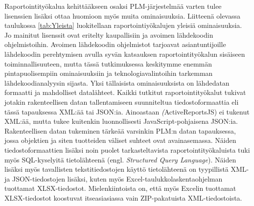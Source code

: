 Raportointityökalua kehittääkseen osaksi PLM-järjestelmää varten tulee lisenssien lisäksi ottaa huomioon myös muita ominaisuuksia. Liitteenä olevassa taulukossa \ref{tab:Yleista} luokitellaan raportointiyökalujen yleisiä ominaisuuksia. Jo mainitut lisenssit ovat eritelty kaupallisiin ja avoimen lähdekoodin ohjelmistoihin. Avoimen lähdekoodin ohjelmistot tarjoavat asiantuntijoille lähdekoodin perehtymisen avulla syvän katsauksen raportointityökalun sisäiseen toiminnallisuuteen, mutta tässä tutkimuksessa keskitymme enemmän pintapuolisempiin ominaisuuksiin ja teknologiavalintoihin tarkemman lähdekoodianalyysin sijasta. Yksi tällaisista ominaisuuksista on lähdedatan formaatti ja mahdolliset datalähteet. Kaikki tutkitut raportointityökalut tukivat jotakin rakenteellisen datan tallentamiseen suunniteltua tiedostoformaattia eli tässä tapauksessa XML:ää tai JSON:ia. Ainoastaan \textit(ActiveReportsJS) ei tukenut XML:ää, mutta tukee kuitenkin luonnollisesti JavaScript-pohjaisena JSON:ia. Rakenteellisen datan tukeminen tärkeää varsinkin PLM:n datan tapauksessa, jossa objektien ja siten tuotteiden väliset suhteet ovat avainasemassa. Näiden tiedostoformaattien lisäksi noin puolet tarkasteltavista raportointityökaluista tuki myös SQL-kyselyitä tietolähteenä  (engl. \textit{Structured Query Language}). Näiden lisäksi myös tavallisten tekstitiedostojen käyttö tietolähteenä on tyypillistä XML- ja JSON-tiedostojen lisäksi, kuten myös Excel-taulukkolaskentaohjelman tuottamat XLSX-tiedostot. Mielenkiintoista on, että myös Excelin tuottamat XLSX-tiedostot koostuvat itseasiasiassa vain ZIP-pakatuista XML-tiedostoista. \cite{miner_under_2022}

